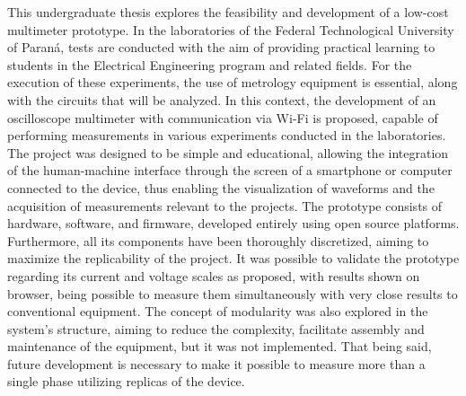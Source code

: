 
\begin{abstractutfpr}%
This undergraduate thesis explores the feasibility and development of a low-cost multimeter prototype. In the laboratories of the Federal Technological University of Paraná, tests are conducted with the aim of providing practical learning to students in the Electrical Engineering program and related fields. For the execution of these experiments, the use of metrology equipment is essential, along with the circuits that will be analyzed.
In this context, the development of an oscilloscope multimeter with communication via Wi-Fi is proposed, capable of performing measurements in various experiments conducted in the laboratories. The project was designed to be simple and educational, allowing the integration of the human-machine interface through the screen of a smartphone or computer connected to the device, thus enabling the visualization of waveforms and the acquisition of measurements relevant to the projects.
The prototype consists of hardware, software, and firmware, developed entirely using open source platforms. Furthermore, all its components have been thoroughly discretized, aiming to maximize the replicability of the project.
It was possible to validate the prototype regarding its current and voltage scales as proposed, with results shown on browser, being possible to measure them simultaneously with very close results to conventional equipment.
The concept of modularity was also explored in the system's structure, aiming to reduce the complexity, facilitate assembly and maintenance of the equipment, but it was not implemented. That being said, future development is necessary to make it possible to measure more than a single phase utilizing replicas of the device.
\end{abstractutfpr}